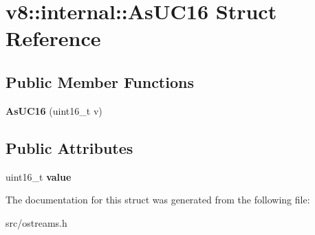 \hypertarget{structv8_1_1internal_1_1_as_u_c16}{}\section{v8\+:\+:internal\+:\+:As\+U\+C16 Struct Reference}
\label{structv8_1_1internal_1_1_as_u_c16}
\subsection*{Public Member Functions}
\begin{DoxyCompactItemize}
\item 
\hypertarget{structv8_1_1internal_1_1_as_u_c16_a3e5320cfba0c7a9db5b53ea51badb725}{}{\bfseries As\+U\+C16} (uint16\+\_\+t v)\label{structv8_1_1internal_1_1_as_u_c16_a3e5320cfba0c7a9db5b53ea51badb725}

\end{DoxyCompactItemize}
\subsection*{Public Attributes}
\begin{DoxyCompactItemize}
\item 
\hypertarget{structv8_1_1internal_1_1_as_u_c16_a47b40c52eca0f02200a80f480afe07d5}{}uint16\+\_\+t {\bfseries value}\label{structv8_1_1internal_1_1_as_u_c16_a47b40c52eca0f02200a80f480afe07d5}

\end{DoxyCompactItemize}


The documentation for this struct was generated from the following file\+:\begin{DoxyCompactItemize}
\item 
src/ostreams.\+h\end{DoxyCompactItemize}
